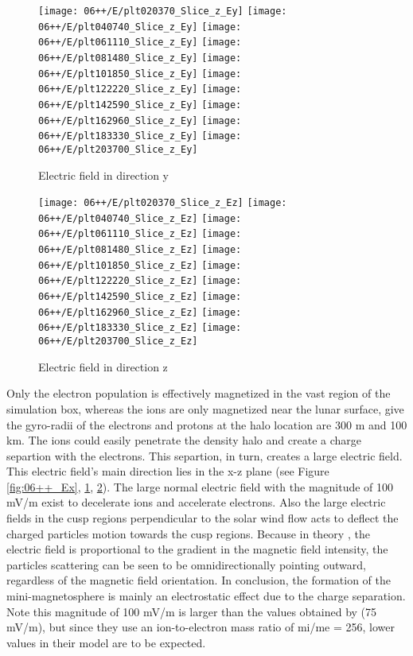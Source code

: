 \begin{figure}
  \centering
  {\texttt{[image: 06++/E/plt020370\_Slice\_z\_Ey]}}
  {\texttt{[image: 06++/E/plt040740\_Slice\_z\_Ey]}}
  {\texttt{[image: 06++/E/plt061110\_Slice\_z\_Ey]}}
  {\texttt{[image: 06++/E/plt081480\_Slice\_z\_Ey]}}
  {\texttt{[image: 06++/E/plt101850\_Slice\_z\_Ey]}}
  {\texttt{[image: 06++/E/plt122220\_Slice\_z\_Ey]}}
  {\texttt{[image: 06++/E/plt142590\_Slice\_z\_Ey]}}
  {\texttt{[image: 06++/E/plt162960\_Slice\_z\_Ey]}}
  {\texttt{[image: 06++/E/plt183330\_Slice\_z\_Ey]}}
  {\texttt{[image: 06++/E/plt203700\_Slice\_z\_Ey]}}
  \caption{Electric field in direction y}\label{fig:06++_Ey}
\end{figure}

\begin{figure}
  \centering
  {\texttt{[image: 06++/E/plt020370\_Slice\_z\_Ez]}}
  {\texttt{[image: 06++/E/plt040740\_Slice\_z\_Ez]}}
  {\texttt{[image: 06++/E/plt061110\_Slice\_z\_Ez]}}
  {\texttt{[image: 06++/E/plt081480\_Slice\_z\_Ez]}}
  {\texttt{[image: 06++/E/plt101850\_Slice\_z\_Ez]}}
  {\texttt{[image: 06++/E/plt122220\_Slice\_z\_Ez]}}
  {\texttt{[image: 06++/E/plt142590\_Slice\_z\_Ez]}}
  {\texttt{[image: 06++/E/plt162960\_Slice\_z\_Ez]}}
  {\texttt{[image: 06++/E/plt183330\_Slice\_z\_Ez]}}
  {\texttt{[image: 06++/E/plt203700\_Slice\_z\_Ez]}}
  \caption{Electric field in direction z}\label{fig:06++_Ez}
\end{figure}

Only the electron population is effectively magnetized in the vast region of the simulation box, whereas the ions are only magnetized near the lunar surface, give the gyro-radii of the electrons and protons at the halo location are 300 m and 100 km. The ions could easily penetrate the density halo and create a charge separtion with the electrons. This separtion, in turn, creates a large electric field. This electric field's main direction lies in the x-z plane (see Figure \ref{fig:06++_Ex}, \ref{fig:06++_Ey}, \ref{fig:06++_Ez}). The large normal electric field with the magnitude of 100 mV/m exist to decelerate ions and accelerate electrons. Also the large electric fields in the cusp regions perpendicular to the solar wind flow acts to deflect the charged particles motion towards the cusp regions. Because in theory \citep{bamfordMinimagnetospheresLunarSurface2012}, the electric field is proportional to the gradient in the magnetic field intensity, the particles scattering can be seen to be omnidirectionally pointing outward, regardless of the magnetic field orientation. In conclusion, the formation of the mini-magnetosphere is mainly an electrostatic effect due to the charge separation. Note this magnitude of 100 mV/m is larger than the values obtained by \cite{decaGeneralMechanismDynamics2015} (75 mV/m), but since they use an ion-to-electron mass ratio of mi/me = 256, lower values in their model are to be expected.


